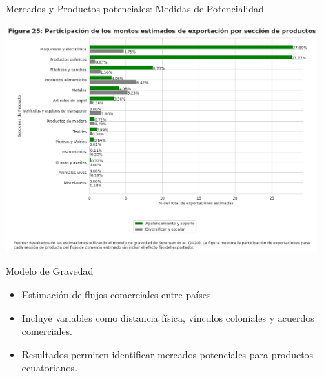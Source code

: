 \documentclass{beamer}
\begin{document}

\begin{frame}{Mercados y Productos potenciales: Medidas de Potencialidad}
    \begin{center}
        \includegraphics[width=0.9\textwidth]{Figura25.png}
    \end{center}
\end{frame}


\begin{frame}{Modelo de Gravedad}
    \begin{itemize}
        \item Estimación de flujos comerciales entre países.
        \item Incluye variables como distancia física, vínculos coloniales y acuerdos comerciales.
        \item Resultados permiten identificar mercados potenciales para productos ecuatorianos.
    \end{itemize}
\end{frame}
\end{document}
